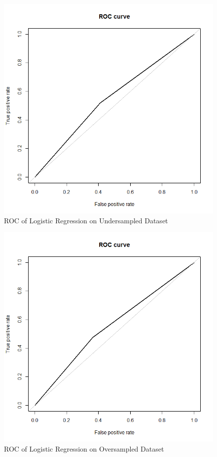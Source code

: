 \documentclass[fleqn,10pt]{SelfArx} %
\begin{document}
	\begin{figure}[h]
	\includegraphics[width=0.8\columnwidth]{plots/ROC_under.png}\centering
	\caption{ROC of Logistic Regression on Undersampled Dataset}
	\end{figure}
	
	\begin{figure}[h]
	\includegraphics[width=0.8\columnwidth]{plots/ROC_over.png}\centering
	\caption{ROC of Logistic Regression on Oversampled Dataset}
	\end{figure}
	
\end{document}
